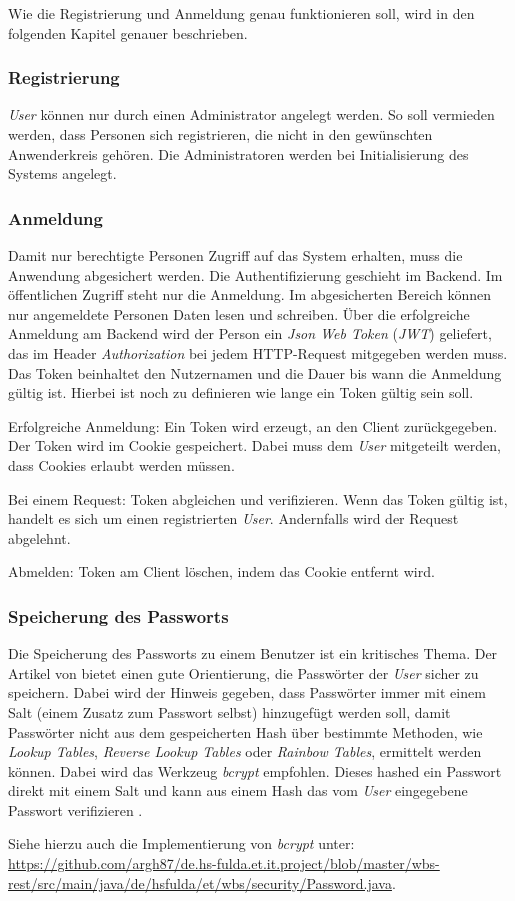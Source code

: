 Wie die Registrierung und Anmeldung genau funktionieren soll, wird in den folgenden Kapitel genauer beschrieben.

\subsubsection{Registrierung}

\textit{User} können nur durch einen Administrator angelegt werden. So soll vermieden werden, dass Personen sich registrieren, die nicht in den gewünschten Anwenderkreis gehören. Die Administratoren werden bei Initialisierung des Systems angelegt.

\subsubsection{Anmeldung}

Damit nur berechtigte Personen Zugriff auf das System erhalten, muss die Anwendung abgesichert werden. Die Authentifizierung geschieht im Backend. Im öffentlichen Zugriff steht nur die Anmeldung. Im abgesicherten Bereich können nur angemeldete Personen Daten lesen und schreiben. Über die erfolgreiche Anmeldung am Backend wird der Person ein \textit{Json Web Token} (\textit{JWT}) geliefert, das im Header \textit{Authorization} bei jedem HTTP-Request mitgegeben werden muss. Das Token beinhaltet den Nutzernamen und die Dauer bis wann die Anmeldung gültig ist. Hierbei ist noch zu definieren wie lange ein Token gültig sein soll.

Erfolgreiche Anmeldung: Ein Token wird erzeugt, an den Client zurückgegeben. Der Token wird im Cookie gespeichert. Dabei muss dem \textit{User} mitgeteilt werden, dass Cookies erlaubt werden müssen.

Bei einem Request: Token abgleichen und verifizieren. Wenn das Token gültig ist, handelt es sich um einen registrierten \textit{User}. Andernfalls wird der Request abgelehnt.

Abmelden: Token am Client löschen, indem das Cookie entfernt wird.

\subsubsection{Speicherung des Passworts}

Die Speicherung des Passworts zu einem Benutzer ist ein kritisches Thema. Der Artikel von \cite{password} bietet einen gute Orientierung, die Passwörter der \textit{User} sicher zu speichern. Dabei wird \ua der Hinweis gegeben, dass Passwörter immer mit einem Salt (einem Zusatz zum Passwort selbst) hinzugefügt werden soll, damit Passwörter nicht aus dem gespeicherten Hash über bestimmte Methoden, wie \zb \textit{Lookup Tables}, \textit{Reverse Lookup Tables} oder \textit{Rainbow Tables}, ermittelt werden können. Dabei wird das Werkzeug \textit{bcrypt} empfohlen. Dieses hashed ein Passwort direkt mit einem Salt und kann aus einem Hash das vom \textit{User} eingegebene Passwort verifizieren \citep[vgl.][]{password}. 

 Siehe hierzu auch die Implementierung von \textit{bcrypt} unter: \url{https://github.com/argh87/de.hs-fulda.et.it.project/blob/master/wbs-rest/src/main/java/de/hsfulda/et/wbs/security/Password.java}.

\newpage